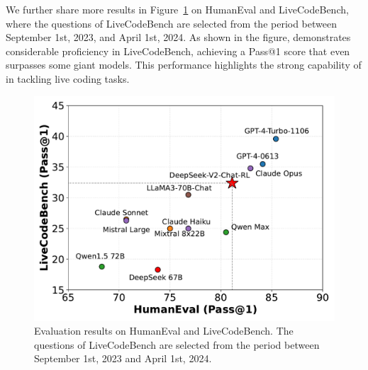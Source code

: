 We further share more results in Figure~\ref{fig:code} on HumanEval and LiveCodeBench, where the questions of LiveCodeBench are selected from the period between September 1st, 2023, and April 1st, 2024.
As shown in the figure, \dsviirl{} demonstrates considerable proficiency in LiveCodeBench, achieving a Pass@1 score that even surpasses some giant models. 
This performance highlights the strong capability of \dsviirl{} in tackling live coding tasks. 

\begin{figure}[!ht]
    \centering
    \includegraphics[width=0.8\linewidth]{figures/code.pdf}
    \caption{
    Evaluation results on HumanEval and LiveCodeBench. The questions of LiveCodeBench are selected from the period between September 1st, 2023 and April 1st, 2024.
    }
    \label{fig:code}
\end{figure}